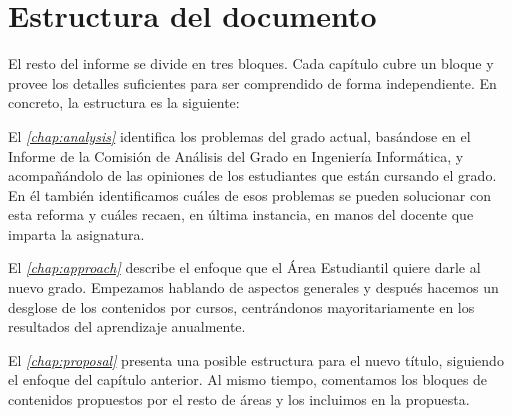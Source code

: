\section{Estructura del documento}

El resto del informe se divide en tres bloques.
Cada capítulo cubre un bloque y provee los detalles suficientes para
ser comprendido de forma independiente.
En concreto, la estructura es la siguiente:

El \emph{\cref{chap:analysis}} identifica los problemas del grado actual,
basándose en
el Informe de la Comisión de Análisis del Grado en Ingeniería Informática,
y acompañándolo de las opiniones de los estudiantes que están cursando el grado.
En él también identificamos
cuáles de esos problemas se pueden solucionar con esta reforma y
cuáles recaen, en última instancia,
en manos del docente que imparta la asignatura.

El \emph{\cref{chap:approach}} describe el enfoque que el Área Estudiantil
quiere darle al nuevo grado.
Empezamos hablando de aspectos generales y después
hacemos un desglose de los contenidos por cursos,
centrándonos mayoritariamente en los resultados del aprendizaje anualmente.

El \emph{\cref{chap:proposal}} presenta una posible estructura
para el nuevo título,
siguiendo el enfoque del capítulo anterior.
Al mismo tiempo, comentamos los bloques de contenidos
propuestos por el resto de áreas
y los incluimos en la propuesta.
